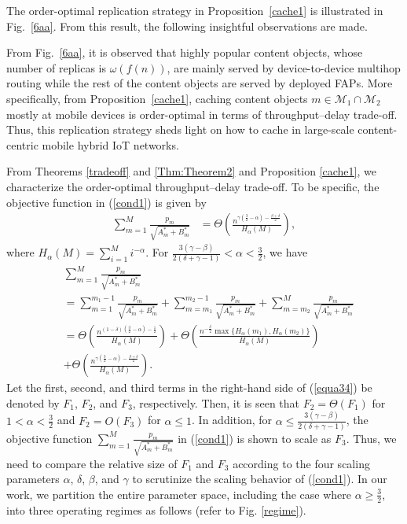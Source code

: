 \documentclass[10pt,journal,compsoc,onecolumn]{IEEEtran}
\begin{document}
The order-optimal replication strategy in Proposition~\ref{cache1} is
illustrated in Fig.~\ref{6aa}. From this result, the following
insightful observations are made.
\begin{remark} \label{re1}
From Fig.~\ref{6aa}, it is observed that highly popular content
objects, whose number of replicas is $\omega\left(f(n)\right)$,
are mainly served by device-to-device multihop routing while the rest
of the content objects are served by deployed FAPs. More
specifically, from Proposition~\ref{cache1}, caching content
objects $m\in\mathcal{M}_1\cap\mathcal{M}_2$ mostly at mobile
devices is order-optimal in terms of throughput--delay trade-off. Thus,
this replication strategy sheds light on how to cache in
large-scale content-centric mobile hybrid IoT networks.
\end{remark}
From Theorems \ref{tradeoff} and \ref{Thm:Theorem2} and Proposition
\ref{cache1}, we characterize the order-optimal throughput--delay
trade-off. To be specific, the objective function in (\ref{cond1})
is given by
\begin{align}
\sum_{m=1}^{M} \frac{p_m}{\sqrt{A_m^*+B_m^*}}&=\Theta\left(\frac{n^{\gamma(\frac{3}{2}-\alpha)-\frac{\beta+\delta}{2}}}{H_{\alpha}(M)}\right), \nonumber
\end{align}
where $H_{\alpha}(M)=\sum_{i=1}^M i^{-\alpha}$. For $\frac{3(\gamma-\beta)}{2(\delta+\gamma-1)}<\alpha <  \frac{3}{2}$, we have
\begin{align}\label{equa34}
&\sum_{m=1}^{M} \frac{p_m}{\sqrt{A_m^*+B_m^*}}\nonumber\\&=\!\sum_{m=1}^{m_1-1}\! \frac{p_m}{\sqrt{A_m^*\!+\!B_m^*}}\!+\!\sum_{m=m_1}^{m_2-1}\! \frac{p_m}{\sqrt{A_m^*\!+\!B_m^*}}\!+\!\sum_{m=m_2}^{M}\! \frac{p_m}{\sqrt{A_m^*\!+\!B_m^*}} \nonumber \\&=
\Theta\!\left(\!\frac{n^{(1-\delta)(\frac{3}{2}-\alpha)-\frac{1}{2}}}{H_{\alpha}(M)}\!\right)\!+\!\Theta\!\left(\!\frac{\!n^{-\!\frac{\delta}{2}}\max\lbrace H_{\alpha}(m_1),H_{\alpha}(m_2)\rbrace}{H_{\alpha}(M)}\!\right)\nonumber\\&+\Theta\left(\frac{n^{\gamma(\frac{3}{2}-\alpha)-\frac{\beta+\delta}{2}}}{H_{\alpha}(M)}\right).
\end{align}
Let the first, second, and third terms in the right-hand side of (\ref{equa34}) be denoted by $F_1$, $F_2$, and $F_3$, respectively. Then, it is seen that $F_2=\Theta(F_1)$ for $1<\alpha<\frac{3}{2}$ and $F_2=O(F_3)$ for $\alpha\leq 1$. In addition, for $\alpha \leq\frac{3(\gamma-\beta)}{2(\delta+\gamma-1)}$, the objective function $\sum_{m=1}^{M} \frac{p_m}{\sqrt{A_m^*+B_m^*}}$ in (\ref{cond1}) is shown to scale as $F_3$. Thus, we need to compare the relative size of $F_1$ and $F_3$ according to the four scaling parameters $\alpha$, $\delta$, $\beta$, and $\gamma$ to scrutinize the scaling behavior of (\ref{cond1}). In our work, we partition the entire parameter space, including the case where $\alpha\geq \frac{3}{2}$, into three operating regimes as follows (refer to Fig. \ref{regime}).
\end{document}
